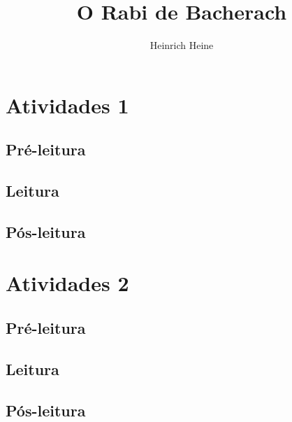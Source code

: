 \documentclass{article}
\begin{document}
\newcommand{\AutorLivro}{Heinrich Heine} 
\newcommand{\TituloLivro}{O Rabi de Bacherach}
\newcommand{\Tema}{Ficção, mistério e fantasia}
\newcommand{\Genero}{Poema}
\newcommand{\imagemCapa}{PNLD0018-01.png}
\newcommand{\issnppub}{---}
\newcommand{\issnepub}{---}
\newcommand{\colaborador}{\textbf{Fulano de Tal} é uma pessoa incrível e vai fazer um bom serviço.}


\title{\TituloLivro}
\author{\AutorLivro}
\def\authornotes{\colaborador}

\date{}
\maketitle
\tableofcontents




\section{Atividades 1}


\subsection{Pré-leitura}
\subsection{Leitura}
\subsection{Pós-leitura}



\section{Atividades 2}

\subsection{Pré-leitura}
\subsection{Leitura}
\subsection{Pós-leitura}

\lipsum
\end{document}
